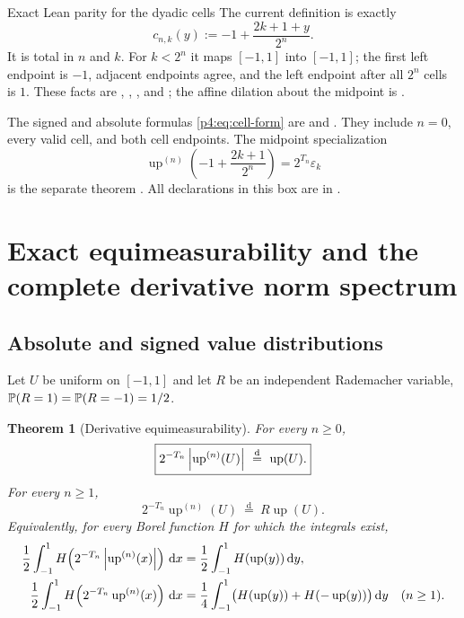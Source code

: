 \documentclass[11pt,oneside]{article}
\newtheorem{theorem}{Theorem}[section]
\theoremstyle{definition}
\theoremstyle{remark}
\newcommand{\Up}{\operatorname{up}}
\newcommand{\dd}{\,\mathrm d}
\begin{document}
\begin{statusbox}{Exact Lean parity for the dyadic cells}
The current definition
 is exactly
\[
 c_{n,k}(y):=-1+\frac{2k+1+y}{2^n}.
\]
It is total in \(n\) and \(k\).  For \(k<2^n\) it maps \([-1,1]\) into \([-1,1]\);
the first left endpoint is \(-1\), adjacent endpoints agree, and the left endpoint after
all \(2^n\) cells is \(1\).  These facts are
,
,
, and
; the affine dilation about the midpoint is
.

The signed and absolute formulas \eqref{p4:eq:cell-form} are
 and
.  They include \(n=0\), every valid cell, and both
cell endpoints.  The midpoint specialization
\[
 \Up^{(n)}\!\left(-1+\frac{2k+1}{2^n}\right)
 =2^{T_n}\varepsilon_k
\]
is the separate theorem .  All declarations in this
box are in .
\end{statusbox}

\section{Exact equimeasurability and the complete derivative norm spectrum}
\label{p4:sec:equimeasurability}

\subsection{Absolute and signed value distributions}

Let $U$ be uniform on $[-1,1]$ and let $R$ be an independent Rademacher variable,
$\mathbb P(R=1)=\mathbb P(R=-1)=1/2$.

\begin{theorem}[Derivative equimeasurability]
\label{p4:thm:equimeasurable}
For every $n\geq0$,
\begin{equation}
 \boxed{
 2^{-T_n}\abs{\Up^{(n)}(U)}\ \overset{\mathrm d}=\ \Up(U).}
 \label{p4:eq:absolute-equimeasurable}
\end{equation}
For every $n\geq1$,
\begin{equation}
 \boxed{
 2^{-T_n}\Up^{(n)}(U)\ \overset{\mathrm d}=\ R\Up(U).}
 \label{p4:eq:signed-equimeasurable}
\end{equation}
Equivalently, for every Borel function $H$ for which the integrals exist,
\begin{align}
 \frac12\int_{-1}^{1}H\!\left(2^{-T_n}\abs{\Up^{(n)}(x)}\right)\dd x
 &=\frac12\int_{-1}^{1}H(\Up(y))\dd y,\label{p4:eq:H-absolute}\\
 \frac12\int_{-1}^{1}H\!\left(2^{-T_n}\Up^{(n)}(x)\right)\dd x
 &=\frac14\int_{-1}^{1}\bigl(H(\Up(y))+H(-\Up(y))\bigr)\dd y
 \quad(n\geq1).
 \label{p4:eq:H-signed}
\end{align}
\end{theorem}
\end{document}
